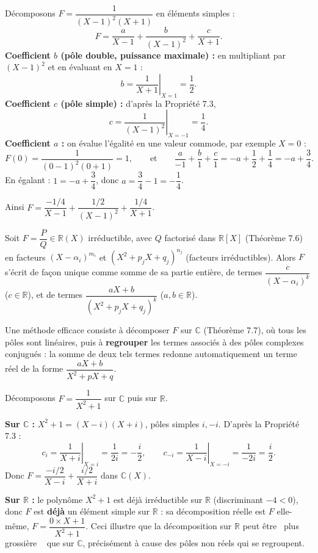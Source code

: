 \documentclass[a4paper,12pt,openany]{book}
\providecommand{\og}{\guillemotleft~}
\providecommand{\fg}{\ifhmode~\fi\guillemotright}
\begin{document}
\begin{exemple}
Décomposons $F = \dfrac{1}{(X-1)^2(X+1)}$ en éléments simples :
\[
F = \frac{a}{X-1} + \frac{b}{(X-1)^2} + \frac{c}{X+1}.
\]
\textbf{Coefficient $b$ (pôle double, puissance maximale) :} en
multipliant par $(X-1)^2$ et en évaluant en $X=1$ :
\[
b = \left.\frac{1}{X+1}\right|_{X=1} = \frac12.
\]
\textbf{Coefficient $c$ (pôle simple) :} d'après la Propriété 7.3,
\[
c = \left.\frac{1}{(X-1)^2}\right|_{X=-1} = \frac{1}{4}.
\]
\textbf{Coefficient $a$ :} on évalue l'égalité en une valeur commode,
par exemple $X=0$ :
\[
F(0) = \frac{1}{(0-1)^2(0+1)} = 1, \qquad \text{et} \qquad
\frac{a}{-1}+\frac{b}{1}+\frac{c}{1} = -a+\frac12+\frac14 = -a+\frac34.
\]
En égalant : $1 = -a+\dfrac34$, donc $a = \dfrac34-1 = -\dfrac14$.

Ainsi $F = \dfrac{-1/4}{X-1} + \dfrac{1/2}{(X-1)^2} + \dfrac{1/4}{X+1}$.
\end{exemple}

\begin{theoreme}
Soit $F=\dfrac{P}{Q}\in\mathbb{R}(X)$ irréductible, avec $Q$ factorisé
dans $\mathbb{R}[X]$ (Théorème 7.6) en facteurs $(X-\alpha_i)^{m_i}$ et
$(X^2+p_jX+q_j)^{n_j}$ (facteurs irréductibles). Alors $F$ s'écrit de
façon unique comme somme de sa partie entière, de termes
$\dfrac{c}{(X-\alpha_i)^k}$ ($c\in\mathbb{R}$), et de termes
$\dfrac{aX+b}{(X^2+p_jX+q_j)^k}$ ($a,b\in\mathbb{R}$).
\end{theoreme}

\begin{remarque}
Une méthode efficace consiste à décomposer $F$ sur $\mathbb{C}$
(Théorème 7.7), où tous les pôles sont linéaires, puis à \textbf{regrouper}
les termes associés à des pôles complexes conjugués : la somme de deux
tels termes redonne automatiquement un terme réel de la forme
$\dfrac{aX+b}{X^2+pX+q}$.
\end{remarque}

\begin{exemple}[7.7]
Décomposons $F=\dfrac{1}{X^2+1}$ sur $\mathbb{C}$ puis sur $\mathbb{R}$.

\textbf{Sur $\mathbb{C}$ :} $X^2+1=(X-i)(X+i)$, pôles simples $i,-i$.
D'après la Propriété 7.3 :
\[
c_i = \left.\frac{1}{X+i}\right|_{X=i} = \frac{1}{2i} = -\frac{i}{2},
\qquad c_{-i} = \left.\frac{1}{X-i}\right|_{X=-i} = \frac{1}{-2i} =
\frac{i}{2}.
\]
Donc $F = \dfrac{-i/2}{X-i} + \dfrac{i/2}{X+i}$ dans $\mathbb{C}(X)$.

\textbf{Sur $\mathbb{R}$ :} le polynôme $X^2+1$ est déjà irréductible sur
$\mathbb{R}$ (discriminant $-4<0$), donc $F$ est \textbf{déjà} un élément
simple sur $\mathbb{R}$ : sa décomposition réelle est $F$ elle-même,
$F = \dfrac{0\times X+1}{X^2+1}$. Ceci illustre que la décomposition sur
$\mathbb{R}$ peut être \og plus grossière \fg{} que sur $\mathbb{C}$,
précisément à cause des pôles non réels qui se regroupent.
\end{exemple}
\end{document}
